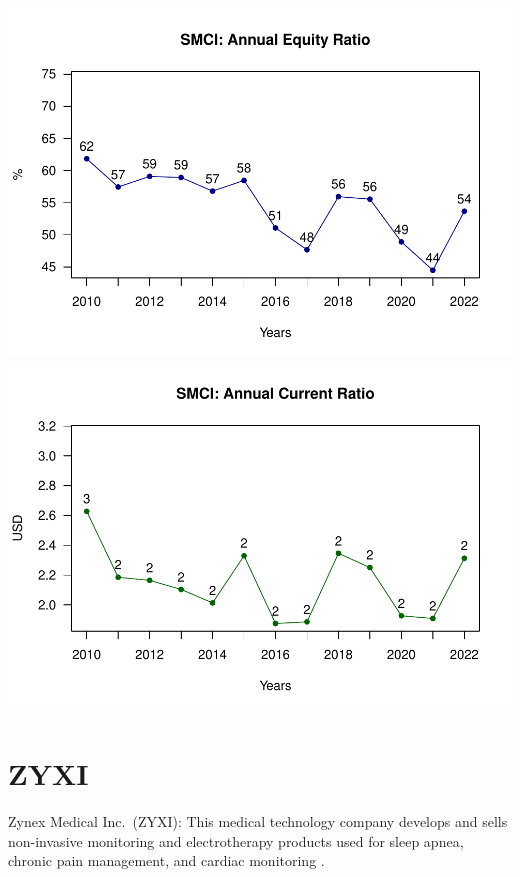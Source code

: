 \documentclass[
]{book}
\begin{document}
\includegraphics{_main_files/figure-latex/unnamed-chunk-1-9.pdf}
\includegraphics{_main_files/figure-latex/unnamed-chunk-1-10.pdf}

\hypertarget{zyxi}{%
\section{ZYXI}\label{zyxi}}

Zynex Medical Inc.~(ZYXI): This medical technology company develops and sells non-invasive monitoring and electrotherapy products used for sleep apnea, chronic pain management, and cardiac monitoring .
\end{document}
